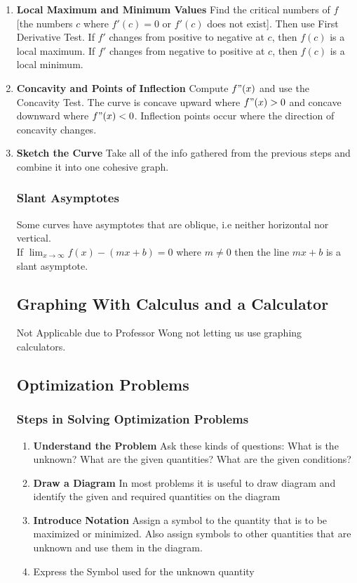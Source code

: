 \documentclass[10pt,a4paper]{article}
\begin{document}
\begin{enumerate}
			\item \textbf{Local Maximum and Minimum Values} Find the critical numbers of $f$[the numbers $c$ where $f'(c)=0$ or $f'(c)$ does not exist]. Then use First Derivative Test. If $f'$ changes from positive to negative at $c$, then $f(c)$ is a local maximum. If $f'$ changes from negative to positive at $c$, then $f(c)$ is a local minimum.
			
			\item \textbf{Concavity and Points of Inflection} Compute $f"(x)$ and use the Concavity Test. The curve is concave upward where $f"(x) > 0$ and concave downward where $f"(x) < 0$. Inflection points occur where the direction of concavity changes.
			
			\item \textbf{Sketch the Curve} Take all of the info gathered from the previous steps and combine it into one cohesive graph.
			
	\subsubsection{Slant Asymptotes}
		Some curves have asymptotes that are oblique, i.e neither horizontal nor vertical.
		\\ If $\lim_{x \rightarrow \infty}{f(x)-(mx+b)} = 0$ where $m \neq 0$ then the line $mx+b$ is a slant asymptote.
\subsection{Graphing With Calculus and a Calculator}
Not Applicable due to Professor Wong not letting us use graphing calculators.

\subsection{Optimization Problems}
	\subsubsection{Steps in Solving Optimization Problems}
		\begin{enumerate}
			\item \textbf{Understand the Problem} Ask these kinds of questions: What is the unknown? What are the given quantities? What are the given conditions?
			
			\item \textbf{Draw a Diagram} In most problems it is useful to draw diagram and identify the given and required quantities on the diagram
			
			\item \textbf{Introduce Notation} Assign a symbol to the quantity that is to be maximized or minimized. Also assign symbols to other quantities that are unknown and use them in the diagram.
			
			\item Express the Symbol used for the unknown quantity
		\end{enumerate}
			
			
			
		\end{enumerate}

	



	
\end{document}
